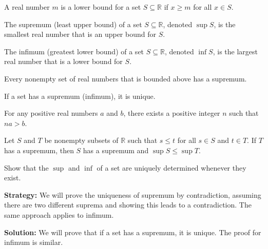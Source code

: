 \begin{definition}
A real number $m$ is a lower bound for a set $S \subseteq \mathbb{R}$ if $x \geq m$ for all $x \in S$.
\end{definition}

\begin{definition}[Supremum]
The supremum (least upper bound) of a set $S \subseteq \mathbb{R}$, denoted $\sup S$, is the smallest real number that is an upper bound for $S$.
\end{definition}

\begin{definition}[Infimum]
The infimum (greatest lower bound) of a set $S \subseteq \mathbb{R}$, denoted $\inf S$, is the largest real number that is a lower bound for $S$.
\end{definition}

\begin{theorem}
Every nonempty set of real numbers that is bounded above has a supremum.
\end{theorem}

\begin{theorem}
If a set has a supremum (infimum), it is unique.
\end{theorem}

\begin{theorem}
For any positive real numbers $a$ and $b$, there exists a positive integer $n$ such that $na > b$.
\end{theorem}

\begin{theorem}
Let $S$ and $T$ be nonempty subsets of $\mathbb{R}$ such that $s \leq t$ for all $s \in S$ and $t \in T$. If $T$ has a supremum, then $S$ has a supremum and $\sup S \leq \sup T$.
\end{theorem}




\begin{problembox}
Show that the $\sup$ and $\inf$ of a set are uniquely determined whenever they exist.
\end{problembox}

\noindent\textbf{Strategy:} We will prove the uniqueness of supremum by contradiction, assuming there are two different suprema and showing this leads to a contradiction. The same approach applies to infimum.

\bigskip\noindent\textbf{Solution:}
We will prove that if a set has a supremum, it is unique. The proof for infimum is similar.

